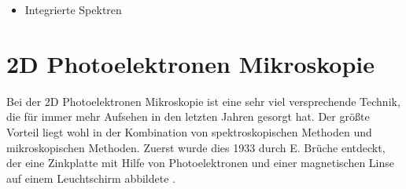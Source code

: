         \begin{itemize}
            \item Integrierte Spektren
        \end{itemize}


    

    \section{2D Photoelektronen Mikroskopie} \label{sec:2D-PES}
        Bei der 2D Photoelektronen Mikroskopie ist eine sehr viel versprechende Technik, die für immer mehr Aufsehen in den letzten Jahren gesorgt hat.
        Der größte Vorteil liegt wohl in der Kombination von spektroskopischen Methoden und mikroskopischen Methoden.
        Zuerst wurde dies 1933 durch E. Brüche entdeckt, der eine Zinkplatte mit Hilfe von Photoelektronen und einer magnetischen Linse auf einem Leuchtschirm abbildete \cite{bruche_elektronenmikroskopische_1933}.

